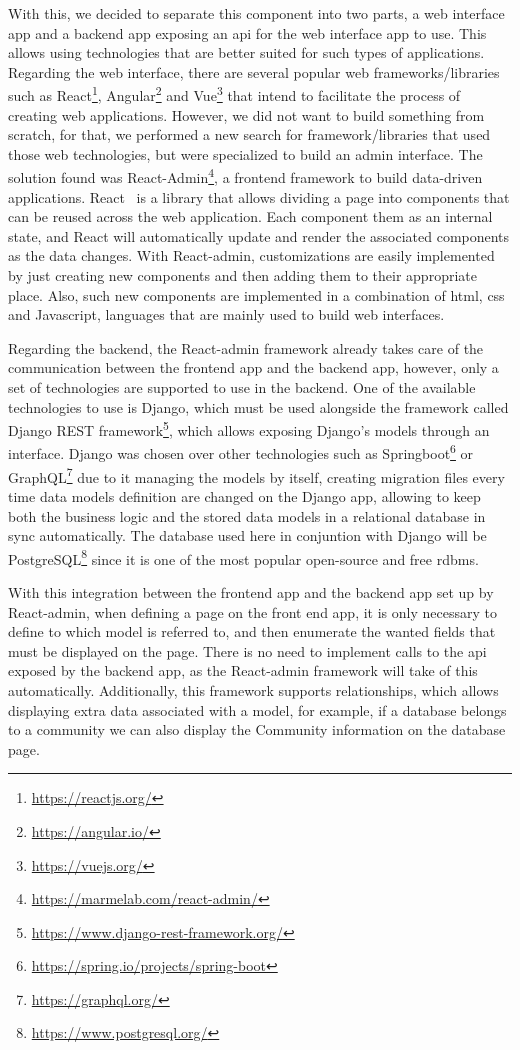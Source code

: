 With this, we decided to separate this component into two parts, a web interface app and a backend app exposing an \gls{api} for the web interface app to use.
This allows using technologies that are better suited for such types of applications.
Regarding the web interface, there are several popular web frameworks/libraries such as React\footnote{\url{https://reactjs.org/}}, Angular\footnote{\url{https://angular.io/}} and Vue\footnote{\url{https://vuejs.org/}} that intend to facilitate the process of creating web applications.
However, we did not want to build something from scratch, for that, we performed a new search for framework/libraries that used those web technologies, but were specialized to build an admin interface.
The solution found was React-Admin\footnote{\url{https://marmelab.com/react-admin/}}, a frontend framework to build data-driven applications.
React~\cite{react} is a library that allows dividing a page into components that can be reused across the web application.
Each component them as an internal state, and React will automatically update and render the associated components as the data changes.
With React-admin, customizations are easily implemented by just creating new components and then adding them to their appropriate place.
Also, such new components are implemented in a combination of \gls{html}, \gls{css} and Javascript, languages that are mainly used to build web interfaces.

Regarding the backend, the React-admin framework already takes care of the communication between the frontend app and the backend app, however, only a set of technologies are supported to use in the backend.
One of the available technologies to use is Django, which must be used alongside the framework called Django REST framework\footnote{\url{https://www.django-rest-framework.org/}}, which allows exposing Django's models through an interface.
Django was chosen over other technologies such as Springboot\footnote{\url{https://spring.io/projects/spring-boot}} or GraphQL\footnote{\url{https://graphql.org/}} due to it managing the models by itself, creating migration files every time data models definition are changed on the Django app, allowing to keep both the business logic and the stored data models in a relational database in sync automatically.
The database used here in conjuntion with Django will be PostgreSQL\footnote{\url{https://www.postgresql.org/}} since it is one of the most popular open-source and free \gls{rdbms}.

With this integration between the frontend app and the backend app set up by React-admin, when defining a page on the front end app, it is only necessary to define to which model is referred to, and then enumerate the wanted fields that must be displayed on the page.
There is no need to implement calls to the \gls{api} exposed by the backend app, as the React-admin framework will take of this automatically.
Additionally, this framework supports relationships, which allows displaying extra data associated with a model, for example, if a database belongs to a community we can also display the Community information on the database page.

